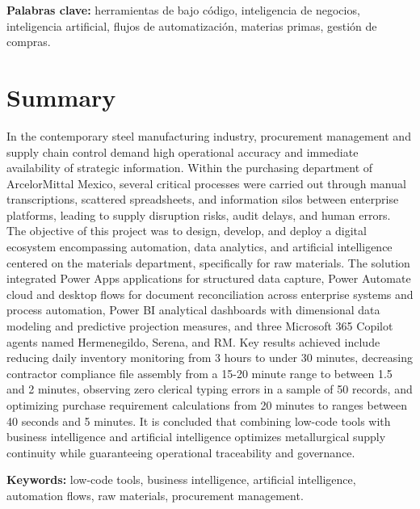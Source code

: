 \vspace{1em}
\textbf{Palabras clave:} herramientas de bajo código, inteligencia de negocios, inteligencia artificial, flujos de automatización, materias primas, gestión de compras.


\clearpage
\section*{\centering Summary}

In the contemporary steel manufacturing industry, procurement management and supply chain control demand high operational accuracy and immediate availability of strategic information. Within the purchasing department of ArcelorMittal Mexico, several critical processes were carried out through manual transcriptions, scattered spreadsheets, and information silos between enterprise platforms, leading to supply disruption risks, audit delays, and human errors. The objective of this project was to design, develop, and deploy a digital ecosystem encompassing automation, data analytics, and artificial intelligence centered on the materials department, specifically for raw materials. The solution integrated Power Apps applications for structured data capture, Power Automate cloud and desktop flows for document reconciliation across enterprise systems and process automation, Power BI analytical dashboards with dimensional data modeling and predictive projection measures, and three Microsoft 365 Copilot agents named Hermenegildo, Serena, and RM. Key results achieved include reducing daily inventory monitoring from 3 hours to under 30 minutes, decreasing contractor compliance file assembly from a 15-20 minute range to between 1.5 and 2 minutes, observing zero clerical typing errors in a sample of 50 records, and optimizing purchase requirement calculations from 20 minutes to ranges between 40 seconds and 5 minutes. It is concluded that combining low-code tools with business intelligence and artificial intelligence optimizes metallurgical supply continuity while guaranteeing operational traceability and governance.

\vspace{1em}
\textbf{Keywords:} low-code tools, business intelligence, artificial intelligence, automation flows, raw materials, procurement management.